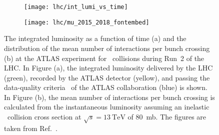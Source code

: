 
\begin{figure}[htbp]
  \centering

  \begin{subfigure}{0.47\textwidth}
    \texttt{[image: lhc/int\_lumi\_vs\_time]}
    \subcaption{}%
    \label{fig:atlas_int_lumi_vs_time}
  \end{subfigure}\hspace*{0.02\textwidth}%
  \begin{subfigure}{0.47\textwidth}
    \texttt{[image: lhc/mu\_2015\_2018\_fontembed]}
    \subcaption{}%
    \label{fig:atlas_mu}
  \end{subfigure}

  \caption[Integrated luminosity and mean number of interactions per bunch
  crossing at the ATLAS experiment during Run~2 of the LHC.]{The integrated
    luminosity as a function of time (a) and the distribution of the mean number
    of interactions per bunch crossing (b) at the ATLAS experiment for
    \pp~collisions during Run~2 of the LHC. In Figure (a), the integrated
    luminosity delivered by the LHC (green), recorded by the ATLAS detector
    (yellow), and passing the data-quality criteria~\cite{DAPR-2018-01} of the
    ATLAS collaboration (blue) is shown. In Figure (b), the mean number of
    interactions per bunch crossing is calculated from the instantaneous
    luminosity assuming an inelastic \pp~collision cross section at
    $\sqrt{s} = \SI{13}{\TeV}$ of \SI{80}{\milli\barn}. The figures are taken
    from Ref.~\cite{atlas_luminosity_summary_plots}.}%
  \label{fig:lumi_and_pu}
\end{figure}

